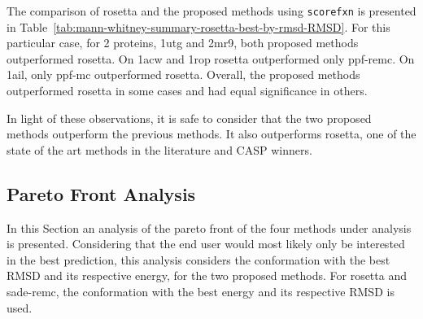 The comparison of rosetta and the proposed methods using \texttt{scorefxn}
is presented in Table~\ref{tab:mann-whitney-summary-rosetta-best-by-rmsd-RMSD}.
For this particular case, for 2 proteins, 1utg and 2mr9, both proposed
methods outperformed rosetta. On 1acw and 1rop rosetta outperformed only
ppf-remc. On 1ail, only ppf-mc outperformed rosetta. Overall,
the proposed methods outperformed rosetta in some cases and had equal
significance in others.

In light of these observations, it is safe to consider that the two proposed
methods outperform the previous methods. It also outperforms rosetta, one of
the state of the art methods in the literature and CASP winners.

\subsection{Pareto Front Analysis}\label{sec:pareto-front-analysis}

In this Section an analysis of the pareto front of the four methods under
analysis is presented. Considering that the end user would most likely only be
interested in the best prediction, this analysis considers the conformation with
the best RMSD and its respective energy, for the two proposed methods. For
rosetta and sade-remc, the conformation with the best energy and its respective
RMSD is used.

